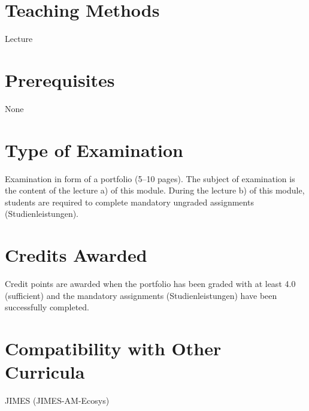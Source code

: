 \documentclass[
  letterpaper,
  10pt,
  openany]{book}
\begin{document}
\section*{Teaching Methods}\label{teaching-methods-3}


Lecture

\section*{Prerequisites}\label{prerequisites-3}


None

\section*{Type of Examination}\label{type-of-examination-3}


Examination in form of a portfolio (5--10 pages). The subject of
examination is the content of the lecture a) of this module. During the
lecture b) of this module, students are required to complete mandatory
ungraded assignments (Studienleistungen).

\section*{Credits Awarded}\label{credits-awarded-3}


Credit points are awarded when the portfolio has been graded with at
least 4.0 (sufficient) and the mandatory assignments (Studienleistungen)
have been successfully completed.

\section*{Compatibility with Other
Curricula}\label{compatibility-with-other-curricula-3}


JIMES (JIMES-AM-Ecosys)
\end{document}
